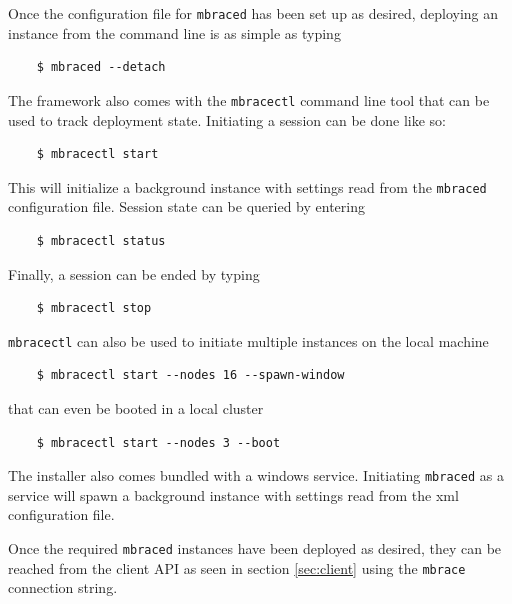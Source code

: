 Once the configuration file for \texttt{mbraced} has been set up as desired,
deploying an instance from the command line is as simple as typing
\begin{verbatim}
    $ mbraced --detach
\end{verbatim}
The \mbrace{} framework also comes with the \texttt{mbracectl} command line tool
that can be used to track deployment state. Initiating a session can be done like so:
\begin{verbatim}
    $ mbracectl start
\end{verbatim}
This will initialize a background instance with settings read from the \texttt{mbraced}
configuration file. Session state can be queried by entering
\begin{verbatim}
    $ mbracectl status
\end{verbatim}
Finally, a session can be ended by typing
\begin{verbatim}
    $ mbracectl stop
\end{verbatim}
\texttt{mbracectl} can also be used to initiate multiple instances on the local machine
\begin{verbatim}
    $ mbracectl start --nodes 16 --spawn-window
\end{verbatim}
that can even be booted in a local cluster
\begin{verbatim}
    $ mbracectl start --nodes 3 --boot
\end{verbatim}

The \mbrace{} installer also comes bundled with a windows service.
Initiating \texttt{mbraced} as a service will spawn a background instance
with settings read from the xml configuration file.

Once the required \texttt{mbraced} instances have been deployed as desired,
they can be reached from the client API as seen in section \ref{sec:client}
using the \texttt{mbrace} connection string.


